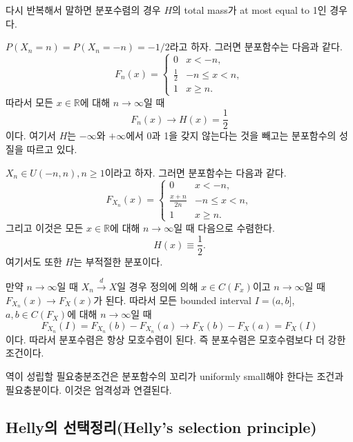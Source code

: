 \documentclass[b5paper,]{scrbook}
\theoremstyle{plain}
\theoremstyle{definition}
\numberwithin{equation}{section}
\let\BeginKnitrBlock\begin \let\EndKnitrBlock\end
\begin{document}
다시 반복해서 말하면 분포수렴의 경우 \(H\)의 total mass가 at most equal to 1인 경우다.

\BeginKnitrBlock{example}[모호수렴의 예(1)]
\protect\hypertarget{exm:unnamed-chunk-125}{}{\label{exm:unnamed-chunk-125} {} }\(P(X_{n}=n)=P(X_{n}=-n)=-1/2\)라고 하자. 그러면 분포함수는 다음과 같다.
\[
F_{n}(x)=
\begin{cases}
0 & x<-n,\\
\frac{1}{2} & -n \leq x < n,\\
1 & x\geq n.
\end{cases}
\]
따라서 모든 \(x\in \mathbb{R}\)에 대해 \(n\rightarrow\infty\)일 때
\[F_{n}(x) \rightarrow H(x) = \frac{1}{2}\]
이다. 여기서 \(H\)는 \(-\infty\)와 \(+\infty\)에서 0과 1을 갖지 않는다는 것을 빼고는 분포함수의 성질을 따르고 있다.
\EndKnitrBlock{example}

\BeginKnitrBlock{example}[모호수렴의 예(2)]
\protect\hypertarget{exm:unnamed-chunk-126}{}{\label{exm:unnamed-chunk-126} {} }\(X_{n} \in U(-n,n),n\geq 1\)이라고 하자. 그러면 분포함수는 다음과 같다.
\[
F_{X_{n}}(x)=
\begin{cases}
0 & x<-n,\\
\frac{x+n}{2n} & -n \leq x < n,\\
1 & x\geq n.
\end{cases}
\]
그리고 이것은 모든 \(x\in \mathbb{R}\)에 대해 \(n\rightarrow\infty\)일 때 다음으로 수렴한다.
\[H(x) \equiv \frac{1}{2}.\]
여기서도 또한 \(H\)는 부적절한 분포이다.
\EndKnitrBlock{example}

만약 \(n\rightarrow\infty\)일 때 \(X_{n} \stackrel{d}{\rightarrow} X\)일 경우 정의에 의해 \(x\in C(F_{x})\)이고 \(n\rightarrow\infty\)일 때 \(F_{X_{n}}(x) \rightarrow F_{X}(x)\)가 된다. 따라서 모든 bounded interval \(I=(a,b]\), \(a,b\in C(F_{X})\)에 대해 \(n\rightarrow\infty\)일 때
\[F_{X_{n}}(I) = F_{X_{n}}(b) - F_{X_{n}}(a) \rightarrow F_{X}(b) - F_{X}(a) = F_{X}(I)\]
이다. 따라서 분포수렴은 항상 모호수렴이 된다. 즉 분포수렴은 모호수렴보다 더 강한 조건이다.

역이 성립할 필요충분조건은 분포함수의 꼬리가 uniformly small해야 한다는 조건과 필요충분이다. 이것은 엄격성과 연결된다.

\hypertarget{helly-hellys-selection-principle}{%
\subsection{Helly의 선택정리(Helly's selection principle)}\label{helly-hellys-selection-principle}}
\end{document}
